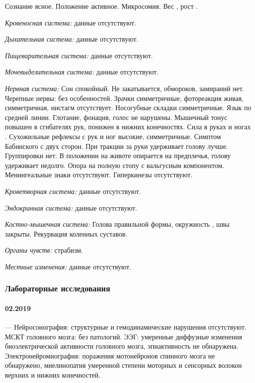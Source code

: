 \documentclass[a4paper,14pt]{extarticle}
\newcommand{\kilogramm}{кг}
\newcommand{\cm}{см}
\begin{document}
Сознание ясное. Положение активное. Микросомия. Вес \numprint[\kilogramm]{6}, рост \numprint[\cm]{68}.

\emph{Кровеносная система:} данные отсутствуют.

\emph{Дыхательная система:} данные отсутствуют.

\emph{Пищеварительная система:} данные отсутствуют.

\emph{Мочевыделительная система:} данные отсутствуют.

\emph{Нервная система:} Сон спокойный. Не закатывается, обмороков, замираний нет. Черепные нервы: без особенностей. Зрачки симметричные, фотореакция живая, симметричная, нистагм отсутствует. Носогубные складки симметричные. Язык по средней линии. Глотание, фонация, голос не нарушены. Мышечный тонус повышен в сгибателях рук, понижен в нижних конечностях. Сила в руках и ногах . Сухожильные рефлексы с рук и ног высокие, симметричные. Симптом Бабинского с двух сторон. При тракции за руки удерживает голову лучше. Группировки нет. В положении на животе опирается на предплечья, голову удерживает недолго. Опора на полную стопу с вальгусным компонентом. Менингеальные знаки отсутствуют. Гиперкинезы отсутствуют.

\emph{Кроветворная система:} данные отсутствуют.

\emph{Эндокринная система:} данные отсутствуют.

\emph{Костно-мышечная система:} Голова правильной формы, окружность \numprint[\cm]{41}, швы закрыты. Рекурвация коленных суставов.

\emph{Органы чувств:} страбизм.

\emph{Местные изменения:} данные отсутствуют.
 
\subsubsection*{Лабораторные исследования}

\paragraph{02.2019} --- Нейросонография: структурные и гемодинамические нарушения отсутствуют. МСКТ головного мозга: без патологий. ЭЭГ: умеренные диффузные изменения биоэлектрической активности головного мозга, эпиактивность не обнаружена. Электронейромиография: поражения мотонейронов спинного мозга не обнаружено, миелинопатия умеренной степени моторных и сенсорных волокон верхних и нижних конечностей.
\end{document}
